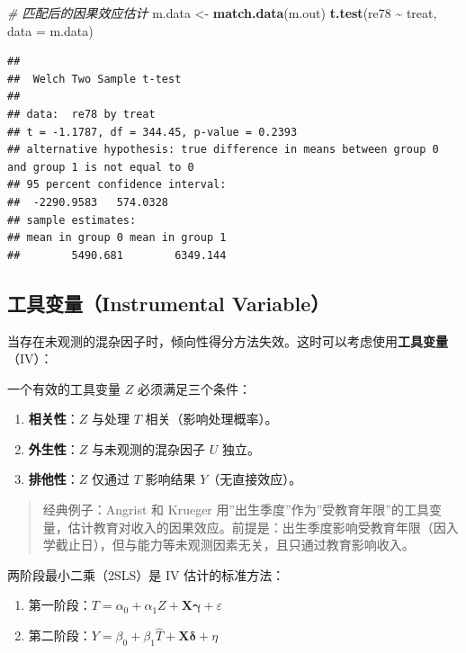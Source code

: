 \documentclass[
]{book}
\newenvironment{Shaded}{\begin{snugshade}}{\end{snugshade}}
\newcommand{\AttributeTok}[1]{\textcolor[rgb]{0.13,0.29,0.53}{#1}}
\newcommand{\CommentTok}[1]{\textcolor[rgb]{0.56,0.35,0.01}{\textit{#1}}}
\newcommand{\FunctionTok}[1]{\textcolor[rgb]{0.13,0.29,0.53}{\textbf{#1}}}
\newcommand{\NormalTok}[1]{#1}
\newcommand{\OtherTok}[1]{\textcolor[rgb]{0.56,0.35,0.01}{#1}}
\newcommand{\SpecialCharTok}[1]{\textcolor[rgb]{0.81,0.36,0.00}{\textbf{#1}}}
\providecommand{\tightlist}{%
  \setlength{\itemsep}{0pt}\setlength{\parskip}{0pt}}
\begin{document}
\begin{Shaded}
\begin{Highlighting}[]
\CommentTok{\# 匹配后的因果效应估计}
\NormalTok{m.data }\OtherTok{\textless{}{-}} \FunctionTok{match.data}\NormalTok{(m.out)}
\FunctionTok{t.test}\NormalTok{(re78 }\SpecialCharTok{\textasciitilde{}}\NormalTok{ treat, }\AttributeTok{data =}\NormalTok{ m.data)}
\end{Highlighting}
\end{Shaded}

\begin{verbatim}
## 
##  Welch Two Sample t-test
## 
## data:  re78 by treat
## t = -1.1787, df = 344.45, p-value = 0.2393
## alternative hypothesis: true difference in means between group 0 and group 1 is not equal to 0
## 95 percent confidence interval:
##  -2290.9583   574.0328
## sample estimates:
## mean in group 0 mean in group 1 
##        5490.681        6349.144
\end{verbatim}

\subsection{工具变量（Instrumental Variable）}\label{ux5de5ux5177ux53d8ux91cfinstrumental-variable}

当存在未观测的混杂因子时，倾向性得分方法失效。这时可以考虑使用\textbf{工具变量}（IV）：

一个有效的工具变量 \(Z\) 必须满足三个条件：

\begin{enumerate}
\def\labelenumi{\arabic{enumi}.}
\tightlist
\item
  \textbf{相关性}：\(Z\) 与处理 \(T\) 相关（影响处理概率）。
\item
  \textbf{外生性}：\(Z\) 与未观测的混杂因子 \(U\) 独立。
\item
  \textbf{排他性}：\(Z\) 仅通过 \(T\) 影响结果 \(Y\)（无直接效应）。
\end{enumerate}

\begin{quote}
经典例子：Angrist 和 Krueger 用''出生季度''作为''受教育年限''的工具变量，估计教育对收入的因果效应。前提是：出生季度影响受教育年限（因入学截止日），但与能力等未观测因素无关，且只通过教育影响收入。
\end{quote}

两阶段最小二乘（2SLS）是 IV 估计的标准方法：

\begin{enumerate}
\def\labelenumi{\arabic{enumi}.}
\tightlist
\item
  第一阶段：\(T = \alpha_0 + \alpha_1 Z + \mathbf{X}\boldsymbol{\gamma} + \varepsilon\)
\item
  第二阶段：\(Y = \beta_0 + \beta_1 \hat{T} + \mathbf{X}\boldsymbol{\delta} + \eta\)
\end{enumerate}
\end{document}
